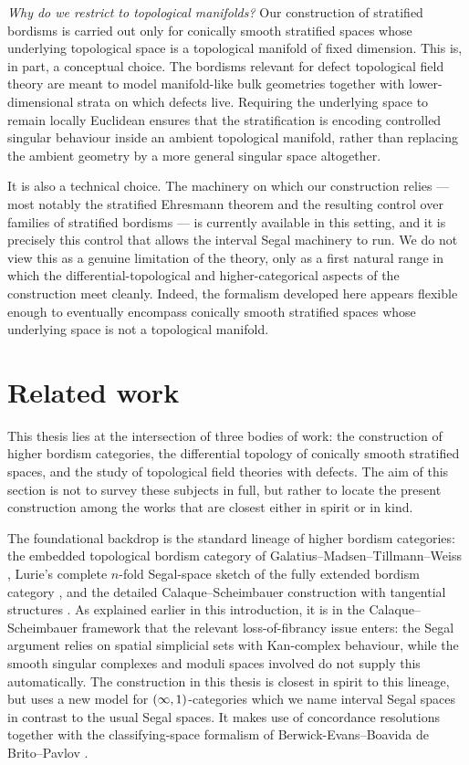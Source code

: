 \emph{Why do we restrict to topological manifolds?}
Our construction of stratified bordisms is carried out only for conically smooth stratified spaces whose underlying topological space is a topological manifold of fixed dimension. This is, in part, a conceptual choice. The bordisms relevant for defect topological field theory are meant to model manifold-like bulk geometries together with lower-dimensional strata on which defects live. Requiring the underlying space to remain locally Euclidean ensures that the stratification is encoding controlled singular behaviour inside an ambient topological manifold, rather than replacing the ambient geometry by a more general singular space altogether.

It is also a technical choice. The machinery on which our construction relies — most notably the stratified Ehresmann theorem and the resulting control over families of stratified bordisms — is currently available in this setting, and it is precisely this control that allows the interval Segal machinery to run. We do not view this as a genuine limitation of the theory, only as a first natural range in which the differential-topological and higher-categorical aspects of the construction meet cleanly. Indeed, the formalism developed here appears flexible enough to eventually encompass conically smooth stratified spaces whose underlying space is not a topological manifold.

\section*{Related work}

\nid This thesis lies at the intersection of three bodies of work: the construction of higher bordism categories, the differential topology of conically smooth stratified spaces, and the study of topological field theories with defects. The aim of this section is not to survey these subjects in full, but rather to locate the present construction among the works that are closest either in spirit or in kind.

The foundational backdrop is the standard lineage of higher bordism categories: the embedded topological bordism category of Galatius--Madsen--Tillmann--Weiss \cite{GMTW09}, Lurie's complete $n$-fold Segal-space sketch of the fully extended bordism category \cite{Lur09}, and the detailed Calaque--Scheimbauer construction with tangential structures \cite{CS19}. As explained earlier in this introduction, it is in the Calaque--Scheimbauer framework that the relevant loss-of-fibrancy issue enters: the Segal argument relies on spatial simplicial sets with Kan-complex behaviour, while the smooth singular complexes and moduli spaces involved do not supply this automatically. The construction in this thesis is closest in spirit to this lineage, but uses a new model for $(\operatorname{\infty},1)$-categories which we name interval Segal spaces in contrast to the usual Segal spaces. It makes use of concordance resolutions together with the classifying-space formalism of Berwick-Evans--Boavida de Brito--Pavlov \cite{BBEP24}.

